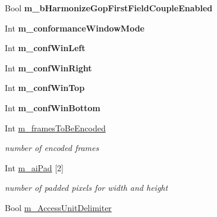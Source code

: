 \begin{DoxyCompactItemize}
\mbox{\label{class_t_app_enc_cfg_a29ec6902f33cd69c359e368c231b9f55}} 
Bool {\bfseries m\+\_\+b\+Harmonize\+Gop\+First\+Field\+Couple\+Enabled}
\item 
\mbox{\label{class_t_app_enc_cfg_aa7070db61a11f75c5e810b5623793c83}} 
Int {\bfseries m\+\_\+conformance\+Window\+Mode}
\item 
\mbox{\label{class_t_app_enc_cfg_a69fce1f85e5c893f5fad6017f625bfd1}} 
Int {\bfseries m\+\_\+conf\+Win\+Left}
\item 
\mbox{\label{class_t_app_enc_cfg_a2e290e30bfc2152802b6b22cddb9bc20}} 
Int {\bfseries m\+\_\+conf\+Win\+Right}
\item 
\mbox{\label{class_t_app_enc_cfg_aec57ad7d009b82b42431c56d7a363db7}} 
Int {\bfseries m\+\_\+conf\+Win\+Top}
\item 
\mbox{\label{class_t_app_enc_cfg_a64785b61b43544dc87ed2d3cb1bfbce5}} 
Int {\bfseries m\+\_\+conf\+Win\+Bottom}
\item 
\mbox{\label{class_t_app_enc_cfg_aedcbde76a5bfc238e9bcae3dcae8cbb9}} 
Int \hyperlink{class_t_app_enc_cfg_aedcbde76a5bfc238e9bcae3dcae8cbb9}{m\+\_\+frames\+To\+Be\+Encoded}
\begin{DoxyCompactList}\small\item\em number of encoded frames \end{DoxyCompactList}\item 
\mbox{\label{class_t_app_enc_cfg_a5f207c033bafac3c1fa3fadfa1d5e72c}} 
Int \hyperlink{class_t_app_enc_cfg_a5f207c033bafac3c1fa3fadfa1d5e72c}{m\+\_\+ai\+Pad} \mbox{[}2\mbox{]}
\begin{DoxyCompactList}\small\item\em number of padded pixels for width and height \end{DoxyCompactList}\item 
\mbox{\label{class_t_app_enc_cfg_adbd1e330753da37154e761d195e48a8f}} 
Bool \hyperlink{class_t_app_enc_cfg_adbd1e330753da37154e761d195e48a8f}{m\+\_\+\+Access\+Unit\+Delimiter}

\end{DoxyCompactItemize}
